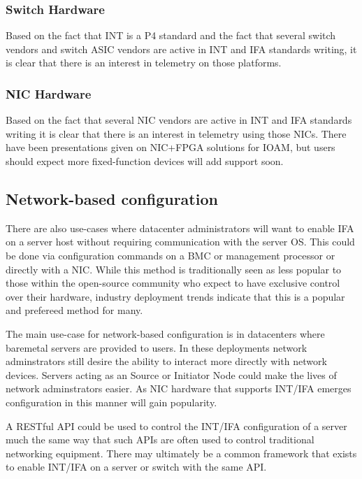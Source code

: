 \documentclass[letterpaper,twocolumn,10pt]{article}
\begin{document}
\subsubsection{Switch Hardware}

Based on the fact that INT is a P4 standard and the fact that several
switch vendors and switch ASIC vendors are active in INT and IFA
standards writing, it is clear that there is an interest in telemetry on
those platforms.

\subsubsection{NIC Hardware}

Based on the fact that several NIC vendors are active in INT and IFA
standards writing it is clear that there is an interest in telemetry
using those NICs.  There have been presentations given on NIC+FPGA
solutions for IOAM, but users should expect more fixed-function devices
will add support soon.

\subsection{Network-based configuration}

There are also use-cases where datacenter administrators will want to
enable IFA on a server host without requiring communication with the
server OS.  This could be done via configuration commands on a BMC or
management processor or directly with a NIC.  While this method is
traditionally seen as less popular to those within the open-source
community who expect to have exclusive control over their hardware,
industry deployment trends indicate that this is a popular and prefereed
method for many.

The main use-case for network-based configuration is in datacenters
where baremetal servers are provided to users.  In these deployments
network adminstrators still desire the ability to interact more directly
with network devices.  Servers acting as an Source or Initiator Node
could make the lives of network adminstrators easier.  As NIC hardware
that supports INT/IFA emerges configuration in this manner will gain
popularity.

A RESTful API could be used to control the INT/IFA configuration
of a server much the same way that such APIs are often used to control
traditional networking equipment.  There may ultimately be a common
framework that exists to enable INT/IFA on a server or switch with the
same API.
\end{document}
